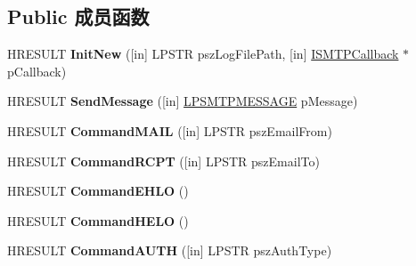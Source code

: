 \subsection*{Public 成员函数}
\begin{DoxyCompactItemize}
\item 
\mbox{\label{interface_i_s_m_t_p_transport_aec15e9b20939f5192a02989e377c483f}} 
H\+R\+E\+S\+U\+LT {\bfseries Init\+New} (\mbox{[}in\mbox{]} L\+P\+S\+TR psz\+Log\+File\+Path, \mbox{[}in\mbox{]} \hyperlink{interface_i_s_m_t_p_callback}{I\+S\+M\+T\+P\+Callback} $\ast$p\+Callback)
\item 
\mbox{\label{interface_i_s_m_t_p_transport_a02f4e37bfac5eb0084a81ec675651d2a}} 
H\+R\+E\+S\+U\+LT {\bfseries Send\+Message} (\mbox{[}in\mbox{]} \hyperlink{struct_i_s_m_t_p_transport_1_1tag_s_m_t_p_m_e_s_s_a_g_e}{L\+P\+S\+M\+T\+P\+M\+E\+S\+S\+A\+GE} p\+Message)
\item 
\mbox{\label{interface_i_s_m_t_p_transport_a20e4bed61ead93890b6fddb814af9eb8}} 
H\+R\+E\+S\+U\+LT {\bfseries Command\+M\+A\+IL} (\mbox{[}in\mbox{]} L\+P\+S\+TR psz\+Email\+From)
\item 
\mbox{\label{interface_i_s_m_t_p_transport_ae447648614ab2887c29945651b8a2967}} 
H\+R\+E\+S\+U\+LT {\bfseries Command\+R\+C\+PT} (\mbox{[}in\mbox{]} L\+P\+S\+TR psz\+Email\+To)
\item 
\mbox{\label{interface_i_s_m_t_p_transport_a902ab0e12192808259c4997501d1245f}} 
H\+R\+E\+S\+U\+LT {\bfseries Command\+E\+H\+LO} ()
\item 
\mbox{\label{interface_i_s_m_t_p_transport_ab244d47623765835ad8bf93036b21642}} 
H\+R\+E\+S\+U\+LT {\bfseries Command\+H\+E\+LO} ()
\item 
\mbox{\label{interface_i_s_m_t_p_transport_aa665d8058ad4fd5c1633b3969a809850}} 
H\+R\+E\+S\+U\+LT {\bfseries Command\+A\+U\+TH} (\mbox{[}in\mbox{]} L\+P\+S\+TR psz\+Auth\+Type)
\item 
\mbox{\label{interface_i_s_m_t_p_transport_a6d3d9cefb09e0a57fd260e0631b6f8c4}} 

\end{DoxyCompactItemize}
